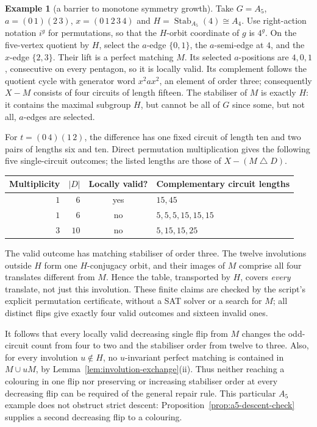 \documentclass[11pt,a4paper]{article}
\theoremstyle{definition}
\newtheorem{example}[theorem]{Example}
\theoremstyle{remark}
\begin{document}
\begin{example}[a barrier to monotone symmetry growth]\label{ex:symmetry-barrier}
Take $G=A_5$, $a=(0\,1)(2\,3)$, $x=(0\,1\,2\,3\,4)$ and $H=\operatorname{Stab}_{A_5}(4)\cong A_4$.  Use right-action notation $i^g$ for permutations, so that the $H$-orbit coordinate of $g$ is $4^g$.  On the five-vertex quotient by $H$, select the $a$-edge $\{0,1\}$, the $a$-semi-edge at $4$, and the $x$-edge $\{2,3\}$.  Their lift is a perfect matching $M$.  Its selected $a$-positions are $4,0,1$, consecutive on every pentagon, so it is locally valid.  Its complement follows the quotient cycle with generator word $x^2ax^2$, an element of order three; consequently $X-M$ consists of four circuits of length fifteen.  The stabiliser of $M$ is exactly $H$: it contains the maximal subgroup $H$, but cannot be all of $G$ since some, but not all, $a$-edges are selected.

For $t=(0\,4)(1\,2)$, the difference has one fixed circuit of length ten and two pairs of lengths six and ten.  Direct permutation multiplication gives the following five single-circuit outcomes; the listed lengths are those of $X-(M\mathbin\triangle D)$.
\begin{center}
\begin{tabular}{@{}rrcl@{}}
\toprule
Multiplicity & $|D|$ & Locally valid? & Complementary circuit lengths\\
\midrule
$1$ & $6$ & yes & $15,45$\\
$1$ & $6$ & no & $5,5,5,15,15,15$\\
$3$ & $10$ & no & $5,15,15,25$\\
\bottomrule
\end{tabular}
\end{center}
The valid outcome has matching stabiliser of order three.  The twelve involutions outside $H$ form one $H$-conjugacy orbit, and their images of $M$ comprise all four translates different from $M$.  Hence the table, transported by $H$, covers \emph{every} translate, not just this involution.  These finite claims are checked by the script's explicit permutation certificate, without a SAT solver or a search for $M$; all distinct flips give exactly four valid outcomes and sixteen invalid ones.

It follows that every locally valid decreasing single flip from $M$ changes the odd-circuit count from four to two and the stabiliser order from twelve to three.  Also, for every involution $u\notin H$, no $u$-invariant perfect matching is contained in $M\cup uM$, by Lemma~\ref{lem:involution-exchange}\textup{(ii)}.  Thus neither reaching a colouring in one flip nor preserving or increasing stabiliser order at every decreasing flip can be required of the general repair rule.  This particular $A_5$ example does not obstruct strict descent: Proposition~\ref{prop:a5-descent-check} supplies a second decreasing flip to a colouring.
\end{example}
\end{document}
